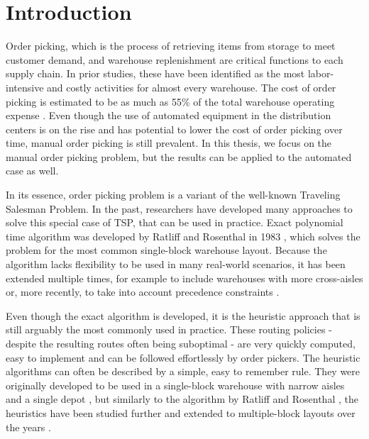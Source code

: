 \chapter*{Introduction}

Order picking, which is the process of retrieving items from storage to meet customer demand, and warehouse replenishment are critical functions to each supply chain.  In prior studies, these have been identified as the most labor-intensive and costly activities for almost every warehouse. The cost of order picking is estimated to be as much as 55\% of the total warehouse operating expense \cite{Tompkins2010}. Even though the use of automated equipment in the distribution centers is on the rise and has potential to lower the cost of order picking over time, manual order picking is still prevalent. In this thesis, we focus on the manual order picking problem, but the results can be applied to the automated case as well.
\par

In its essence, order picking problem is a variant of the well-known Traveling Salesman Problem. In the past, researchers have developed many approaches to solve this special case of TSP, that can be used in practice. Exact polynomial time algorithm was developed by Ratliff and Rosenthal in 1983 \cite{RR}, which solves the problem for the most common single-block warehouse layout. Because the algorithm lacks flexibility to be used in many real-world scenarios, it has been extended multiple times, for example to include warehouses with more cross-aisles \cite{roodbergen2001b} or, more recently, to take into account precedence constraints \cite{zulj2018}.
\par

Even though the exact algorithm is developed, it is the heuristic approach  that is still arguably the most commonly used in practice. These routing policies - despite the resulting routes often being suboptimal - are very quickly computed, easy to implement and can be followed effortlessly by order pickers. The heuristic algorithms can often be described by a simple, easy to remember rule. They were originally developed to be used in a single-block warehouse with narrow aisles and a single depot \cite{hall1993}, but similarly to the algorithm by Ratliff and Rosenthal \cite{RR}, the heuristics have been studied further and extended to multiple-block layouts over the years \cite{vaughan1999}\cite{roodbergen2001}. 
\par

